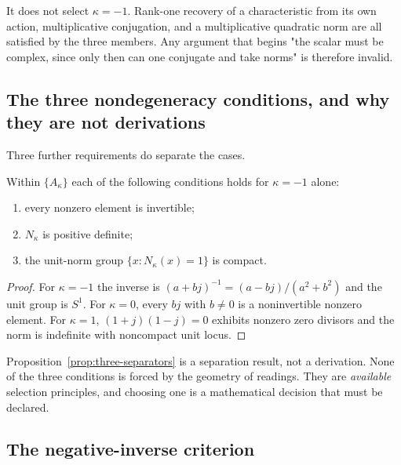 \begin{remark}
\label{rem:not-enough}
It does not select $\kappa=-1$.  Rank-one recovery of a characteristic from its own
action, multiplicative conjugation, and a multiplicative quadratic norm are all
satisfied by the three members.  Any argument that begins "the scalar must be
complex, since only then can one conjugate and take norms" is therefore invalid.
\end{remark}

\subsection{The three nondegeneracy conditions, and why they are not derivations}

Three further requirements do separate the cases.

\begin{proposition}\label{prop:three-separators}
Within $\{A_\kappa\}$ each of the following conditions holds for $\kappa=-1$ alone:
\begin{enumerate}
\item every nonzero element is invertible;
\item $N_\kappa$ is positive definite;
\item the unit-norm group $\{x:N_\kappa(x)=1\}$ is compact.
\end{enumerate}
\end{proposition}

\begin{proof}
For $\kappa=-1$ the inverse is $(a+bj)^{-1}=(a-bj)/(a^{2}+b^{2})$ and the unit group
is $S^{1}$.  For $\kappa=0$, every $bj$ with $b\neq0$ is a noninvertible nonzero
element.  For $\kappa=1$, $(1+j)(1-j)=0$ exhibits nonzero zero divisors and the norm
is indefinite with noncompact unit locus.
\end{proof}

\begin{warning}
Proposition~\ref{prop:three-separators} is a separation result, not a derivation.
None of the three conditions is forced by the geometry of readings.  They are
\emph{available} selection principles, and choosing one is a mathematical decision
that must be declared.
\end{warning}

\subsection{The negative-inverse criterion}

